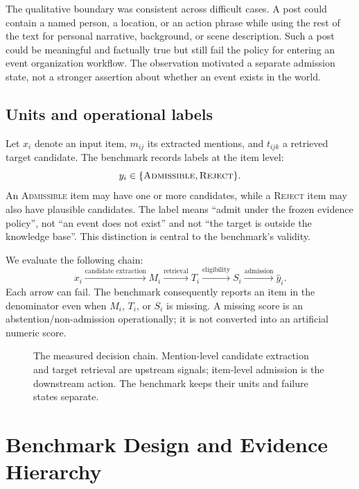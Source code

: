 \documentclass[5p,times]{elsarticle}
\newcommand{\admissible}{\mbox{\textsc{Admissible}}}
\newcommand{\reject}{\mbox{\textsc{Reject}}}
\begin{document}
The qualitative boundary was consistent across difficult cases. A post could contain a named person, a location, or an action phrase while using the rest of the text for personal narrative, background, or scene description. Such a post could be meaningful and factually true but still fail the policy for entering an event organization workflow. The observation motivated a separate admission state, not a stronger assertion about whether an event exists in the world.

\subsection{Units and operational labels}

Let $x_i$ denote an input item, $m_{ij}$ its extracted mentions, and $t_{ijk}$ a retrieved target candidate. The benchmark records labels at the item level:
\begin{equation}
 y_i \in \{\admissible{},\reject{}\}.
\end{equation}
An \admissible{} item may have one or more candidates, while a \reject{} item may also have plausible candidates. The label means ``admit under the frozen evidence policy'', not ``an event does not exist'' and not ``the target is outside the knowledge base''. This distinction is central to the benchmark's validity.

We evaluate the following chain:
{\small
\begin{equation}
 x_i \xrightarrow{\text{candidate extraction}} M_i
 \xrightarrow{\text{retrieval}} T_i
 \xrightarrow{\text{eligibility}} S_i
 \xrightarrow{\text{admission}} \hat y_i.
\end{equation}
}
Each arrow can fail. The benchmark consequently reports an item in the denominator even when $M_i$, $T_i$, or $S_i$ is missing. A missing score is an abstention/non-admission operationally; it is not converted into an artificial numeric score.

\begin{figure}[t]
  \centering
  
  \caption{The measured decision chain. Mention-level candidate extraction and target retrieval are upstream signals; item-level admission is the downstream action. The benchmark keeps their units and failure states separate.}
  \label{fig:pipeline}
\end{figure}

\section{Benchmark Design and Evidence Hierarchy}
\label{sec:benchmark}
\end{document}
